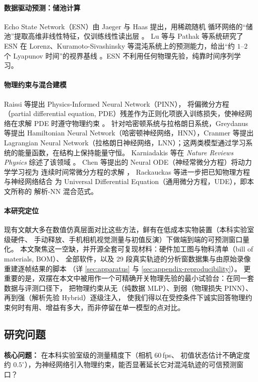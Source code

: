 \documentclass[a4paper,12pt]{ctexart}   %
\let\cite\supercite   %
\renewcommand{\emph}[1]{#1}
\begin{document}
\paragraph{数据驱动预测：储池计算}
Echo State Network（ESN）由 Jaeger 与 Haas 提出，用稀疏随机
循环网络的“储池”提取高维非线性特征，仅训练线性读出层 \cite{jaeger2004}。
Lu 等与 Pathak 等系统研究了 ESN
在 Lorenz、Kuramoto-Sivashinsky 等混沌系统上的预测能力，给出“约 $1$--$2$ 个
Lyapunov 时间”的视界基线 \cite{lu2017reservoir,pathak2018}。ESN 不利用任何物理先验，纯靠时间序列学习。

\paragraph{物理约束与混合建模}
Raissi 等提出 Physics-Informed Neural Network（PINN），
将偏微分方程（partial differential equation, PDE）残差作为正则化项嵌入训练损失，使神经网络在求解 PDE 时遵守物理约束 \cite{raissi2019}。
针对哈密顿系统与拉格朗日系统，Greydanus 等提出 Hamiltonian
Neural Network（哈密顿神经网络，HNN）\cite{greydanus2019}，Cranmer 等提出 Lagrangian Neural
Network（拉格朗日神经网络，LNN）\cite{cranmer2020}；这两类模型通过学习系统的能量函数，在结构上保持能量守恒。
Karniadakis 等在 \textit{Nature Reviews Physics}
综述了该领域 \cite{karniadakis2021review}。
Chen 等提出的 Neural ODE（神经常微分方程）将动力学学习视为
连续时间常微分方程的求解 \cite{chen2018neuralode}，
Rackauckas 等进一步把已知物理方程与神经网络结合
为 Universal Differential Equation（通用微分方程，UDE）\cite{rackauckas2020universal}，即本文所称的 \emph{解析-NN 混合}范式。

\paragraph{本研究定位}
现有文献大多在数值仿真层面对比这些方法，鲜有在低成本实物装置（本科实验室级硬件、
手动释放、手机相机视觉测量与初值反演）下做端到端的可预测窗口量化。
本文聚焦这一空缺，并开源全套可复现材料：硬件加工图与物料清单（bill of materials, BOM）、
全部软件，以及 29 段真实轨迹的分析窗数据集与由原始录像重建逐帧结果的脚本
（详 \cref{sec:apparatus} 与 \cref{sec:appendix-reproducibility}）。
更重要的是，双摆在本文中被用作一个可\emph{精确开关物理先验}的最小试验台：在同一套数据与评测口径下，
把物理约束从无（纯数据 MLP）、到弱（物理损失 PINN）、再到强（解析先验 Hybrid）逐级注入，
使我们得以在受控条件下诚实回答\emph{物理约束何时有用、增益有多大}，而非停留在单一模型的点对比。

\subsection{研究问题}
\textbf{核心问题：} 在本科实验室级的测量精度下（相机 60\,fps、
初值状态估计不确定度约 $0.5^\circ$），为神经网络引入物理约束，能否显著延长它对混沌轨迹的可信预测窗口？
\end{document}
